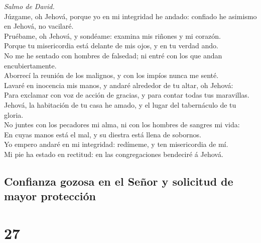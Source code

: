  \emph{Salmo de David.}\\
Júzgame, oh Jehová, porque yo en mi integridad he andado: confiado he
asimismo en Jehová, no vacilaré.\\
 Pruébame, oh Jehová, y sondéame: examina mis riñones y mi
corazón.\\
 Porque tu misericordia está delante de mis ojos, y en tu
verdad ando.\\
 No me he sentado con hombres de falsedad; ni entré con los
que andan encubiertamente.\\
 Aborrecí la reunión de los malignos, y con los impíos nunca
me senté.\\
 Lavaré en inocencia mis manos, y andaré alrededor de tu
altar, oh Jehová:\\
 Para exclamar con voz de acción de gracias, y para contar
todas tus maravillas.\\
 Jehová, la habitación de tu casa he amado, y el lugar del
tabernáculo de tu gloria.\\
 No juntes con los pecadores mi alma, ni con los hombres de
sangres mi vida:\\
 En cuyas manos está el mal, y su diestra está llena de
sobornos.\\
 Yo empero andaré en mi integridad: redímeme, y ten
misericordia de mí.\\
 Mi pie ha estado en rectitud: en las congregaciones
bendeciré á Jehová.

\hypertarget{confianza-gozosa-en-el-seuxf1or-y-solicitud-de-mayor-protecciuxf3n}{%
\subsection{Confianza gozosa en el Señor y solicitud de mayor
protección}\label{confianza-gozosa-en-el-seuxf1or-y-solicitud-de-mayor-protecciuxf3n}}

\hypertarget{section-26}{%
\section{27}\label{section-26}}

